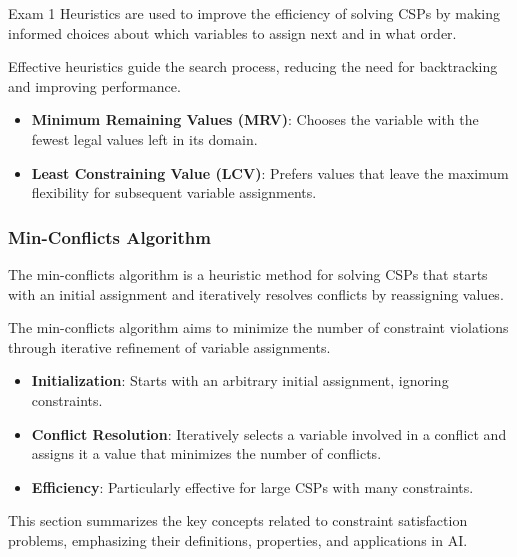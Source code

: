 \begin{examnotes}{Exam 1}
    Heuristics are used to improve the efficiency of solving CSPs by making informed choices about which variables to assign next and in what order.
    
    \begin{highlight}
        Effective heuristics guide the search process, reducing the need for backtracking and improving performance.
        
        \begin{itemize}
            \item \textbf{Minimum Remaining Values (MRV)}: Chooses the variable with the fewest legal values left in its domain.
            \item \textbf{Least Constraining Value (LCV)}: Prefers values that leave the maximum flexibility for subsequent variable assignments.
        \end{itemize}
    \end{highlight}
    
    \subsubsection*{Min-Conflicts Algorithm}
    
    The min-conflicts algorithm is a heuristic method for solving CSPs that starts with an initial assignment and iteratively resolves conflicts by reassigning values.
    
    \begin{highlight}
        The min-conflicts algorithm aims to minimize the number of constraint violations through iterative refinement of variable assignments.
        
        \begin{itemize}
            \item \textbf{Initialization}: Starts with an arbitrary initial assignment, ignoring constraints.
            \item \textbf{Conflict Resolution}: Iteratively selects a variable involved in a conflict and assigns it a value that minimizes the number of conflicts.
            \item \textbf{Efficiency}: Particularly effective for large CSPs with many constraints.
        \end{itemize}
    \end{highlight}
    
    \begin{highlight}
        This section summarizes the key concepts related to constraint satisfaction problems, emphasizing their definitions, properties, and applications in AI.
        

\end{highlight}
\end{examnotes}
